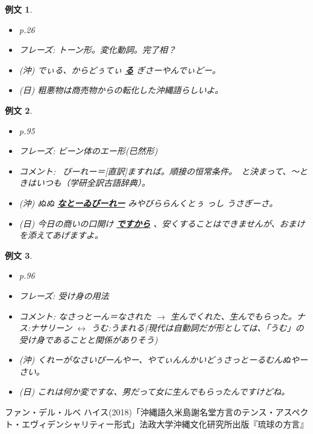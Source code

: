 \documentclass[a4j,12pt]{jarticle}
\theoremstyle{break}
\newtheorem{example}{例文}
\newcommand{\highlight}[1]{
  \textbf{\underline{#1}}
}
\begin{document}
\begin{example}
  \begin{itemize}
  \item p.26
  \item フレーズ: トーン形。変化動詞。完了相？
  \item (沖) でぃる、からどぅてぃ\highlight{る}ぎさーやんでぃどー。
  \item (日) 粗悪物は商売物からの転化した沖縄語らしいよ。
  \end{itemize}
\end{example}
\begin{example}
  \begin{itemize}
  \item p.95
  \item フレーズ: ビーン体のエー形(已然形)
  \item コメント: ~びーれー＝[直訳]ますれば。順接の恒常条件。~と決まって、〜ときはいつも（学研全訳古語辞典）。
  \item (沖) ぬぬ\highlight{なとーゐびーれー} みやびららんくとぅ っし うさぎーさ。
  \item (日) 今日の商いの口開け\highlight{ですから}、安くすることはできませんが、おまけを添えてあげますよ。
  \end{itemize}
\end{example}
\begin{example}
  \begin{itemize}
  \item p.96
  \item フレーズ: 受け身の用法
  \item コメント: なさっとーん＝なされた $\rightarrow$ 生んでくれた、生んでもらった。ナス:ナサリーン $\leftrightarrow$ うむ:うまれる(現代は自動詞だが形としては、「うむ」の受け身であることと関係がありそう)
  \item (沖) くれーがなさいびーんやー、やてぃんんかいどぅさっとーるむんぬやーさい。
  \item (日) これは何か変ですな、男だって女に生んでもらったんですけどね。
  \end{itemize}
\end{example}

\begin{thebibliography}{10}
  ファン・デル・ルベ ハイス(2018)「沖縄語久米島謝名堂方言のテンス・アスペクト・エヴィデンシャリティー形式」法政大学沖縄文化研究所出版『琉球の方言』
\end{thebibliography}
\end{document}
